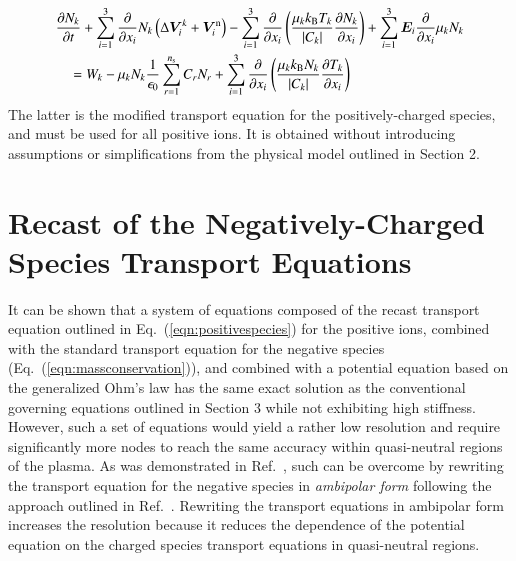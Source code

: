\documentclass[twoside,onecolumn,10pt]{waflarticle}
\renewcommand{\vec}[1]{\bm{#1}}
\newcommand{\alb}{\vspace{0.1cm}\\} %
\newcommand{\mfd}{\displaystyle}
\newcommand{\ns}{{n_{\rm s}}}
\renewcommand{\vec}[1]{\bm{ #1 }}
\begin{document}
%
\begin{equation}
\begin{array}{l}\mfd
  \frac{\partial N_{k}}{\partial t} 
+ \sum_{i=1}^3 \frac{\partial}{\partial x_i} N_k \left(\Delta \vec{V}_i^k + \vec{V}^{\rm n}_i\right) 
- \sum_{i=1}^3  \frac{\partial}{\partial x_i} \left(
                 \frac{\mu_k k_{\rm B} T_{k}}{|C_{k}| } \frac{\partial N_{k}}{\partial x_i}
\right)
+ \sum_{i=1}^3 \vec{E}_i \frac{\partial }{\partial x_i} \mu_{k} N_{k}
 \alb\mfd~~~~~
= 
 W_{k}
-\mu_{k} N_{k}\frac{1}{\epsilon_0} \sum_{r=1}^\ns C_r N_r 
+ \sum_{i=1}^3  \frac{\partial}{\partial x_i} \left(
                 \frac{\mu_k k_{\rm B} N_{k}}{|C_{k}| } \frac{\partial T_{k}}{\partial x_i}
\right)
\end{array}
\label{eqn:positivespecies}
\end{equation}
%
The latter is the modified transport equation for the positively-charged species, and must be used for all positive ions. It is obtained without introducing assumptions or simplifications from the physical model outlined in Section 2.




\section{Recast of the Negatively-Charged Species Transport Equations}

It can be shown that a system of equations composed of the recast transport equation outlined in Eq.\ (\ref{eqn:positivespecies}) for the positive ions, combined with the standard transport equation for the negative species (Eq.\ (\ref{eqn:massconservation})), and combined with a potential equation based on the generalized Ohm's law \cite{jcp:2011:parent} has the same exact solution as the conventional governing equations outlined in Section 3 while not exhibiting high stiffness. However, such a set of equations would yield a rather low resolution and require significantly more nodes to reach the same accuracy within quasi-neutral regions of the plasma. As was  demonstrated in Ref.\ \cite{jcp:2013:parent}, such can be overcome by rewriting the transport equation for the negative species in \emph{ambipolar form} following the approach outlined in Ref.\ \cite{jcp:2011:parent:2}. Rewriting the transport equations in ambipolar form increases the resolution because it reduces the dependence of the potential equation on the charged species transport equations in quasi-neutral regions.     
\end{document}
